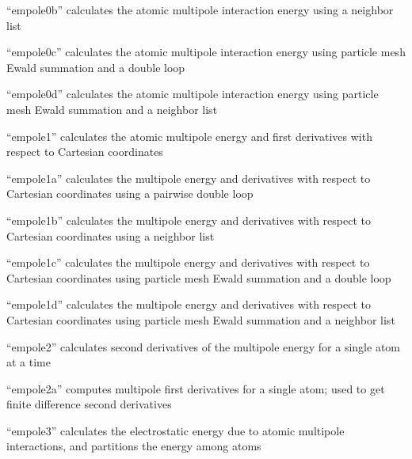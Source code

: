 \documentclass[letterpaper,11pt,english]{sphinxmanual}
\begin{document}

“empole0b” calculates the atomic multipole interaction energy
using a neighbor list


“empole0c” calculates the atomic multipole interaction energy
using particle mesh Ewald summation and a double loop


“empole0d” calculates the atomic multipole interaction energy
using particle mesh Ewald summation and a neighbor list


“empole1” calculates the atomic multipole energy and first
derivatives with respect to Cartesian coordinates


“empole1a” calculates the multipole energy and derivatives with
respect to Cartesian coordinates using a pairwise double loop


“empole1b” calculates the multipole energy and derivatives
with respect to Cartesian coordinates using a neighbor list


“empole1c” calculates the multipole energy and derivatives
with respect to Cartesian coordinates using particle mesh
Ewald summation and a double loop


“empole1d” calculates the multipole energy and derivatives
with respect to Cartesian coordinates using particle mesh Ewald
summation and a neighbor list


“empole2” calculates second derivatives of the multipole energy
for a single atom at a time


“empole2a” computes multipole first derivatives for a single
atom; used to get finite difference second derivatives


“empole3” calculates the electrostatic energy due to atomic
multipole interactions, and partitions the energy among atoms
\end{document}
